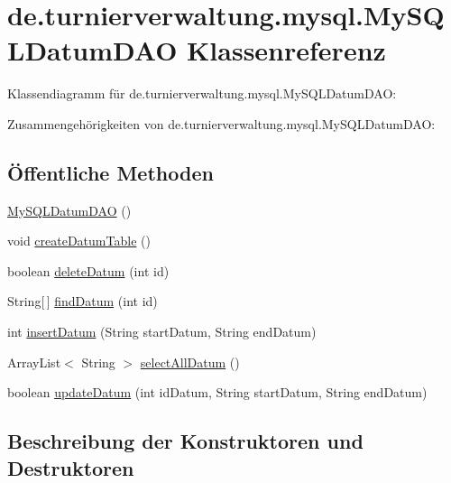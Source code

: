 \hypertarget{classde_1_1turnierverwaltung_1_1mysql_1_1_my_s_q_l_datum_d_a_o}{}\section{de.\+turnierverwaltung.\+mysql.\+My\+S\+Q\+L\+Datum\+D\+AO Klassenreferenz}
\label{classde_1_1turnierverwaltung_1_1mysql_1_1_my_s_q_l_datum_d_a_o}


Klassendiagramm für de.\+turnierverwaltung.\+mysql.\+My\+S\+Q\+L\+Datum\+D\+AO\+:


Zusammengehörigkeiten von de.\+turnierverwaltung.\+mysql.\+My\+S\+Q\+L\+Datum\+D\+AO\+:
\subsection*{Öffentliche Methoden}
\begin{DoxyCompactItemize}
\item 
\hyperlink{classde_1_1turnierverwaltung_1_1mysql_1_1_my_s_q_l_datum_d_a_o_a162deba8a4831e11183b13a29a05d2df}{My\+S\+Q\+L\+Datum\+D\+AO} ()
\item 
void \hyperlink{classde_1_1turnierverwaltung_1_1mysql_1_1_my_s_q_l_datum_d_a_o_af22183f1b3bbebc3a8701093a016a298}{create\+Datum\+Table} ()
\item 
boolean \hyperlink{classde_1_1turnierverwaltung_1_1mysql_1_1_my_s_q_l_datum_d_a_o_a16967a4f349df0150d7f3848b0e00736}{delete\+Datum} (int id)
\item 
String\mbox{[}$\,$\mbox{]} \hyperlink{classde_1_1turnierverwaltung_1_1mysql_1_1_my_s_q_l_datum_d_a_o_a50ed6231c876f8e1cea1646f0e7ec0fd}{find\+Datum} (int id)
\item 
int \hyperlink{classde_1_1turnierverwaltung_1_1mysql_1_1_my_s_q_l_datum_d_a_o_ae6f2f995b602ed4eaab385fb9b814b4c}{insert\+Datum} (String start\+Datum, String end\+Datum)
\item 
Array\+List$<$ String $>$ \hyperlink{classde_1_1turnierverwaltung_1_1mysql_1_1_my_s_q_l_datum_d_a_o_a719a78dec94c054983f0e7990634f15f}{select\+All\+Datum} ()
\item 
boolean \hyperlink{classde_1_1turnierverwaltung_1_1mysql_1_1_my_s_q_l_datum_d_a_o_a469db50145b6bb3b19aa1e9d8d9d6ed7}{update\+Datum} (int id\+Datum, String start\+Datum, String end\+Datum)
\end{DoxyCompactItemize}


\subsection{Beschreibung der Konstruktoren und Destruktoren}
